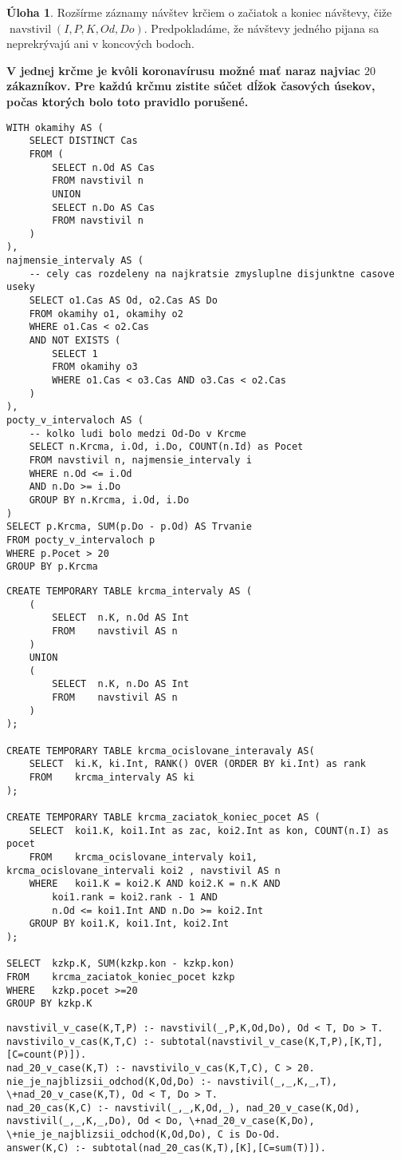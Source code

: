 \documentclass[10pt, a4paper]{article}
\theoremstyle{definition}
\newtheorem{problem}{Úloha}[section]
\DeclareMathOperator{\navstivil}{navstivil}
\begin{document}
\begin{problem}
Rozšírme záznamy návštev krčiem o začiatok a koniec návštevy, čiže $\navstivil(I, P, K, Od, Do)$. Predpokladáme, že návštevy jedného pijana sa neprekrývajú ani v koncových bodoch.

{\bf V jednej krčme je kvôli koronavírusu možné mať naraz najviac $20$ zákazníkov. Pre každú krčmu zistite súčet dĺžok časových úsekov, počas ktorých bolo toto pravidlo porušené.}

\begin{verbatim}
WITH okamihy AS (
    SELECT DISTINCT Cas
    FROM (
        SELECT n.Od AS Cas
        FROM navstivil n
        UNION
        SELECT n.Do AS Cas
        FROM navstivil n
    )
),
najmensie_intervaly AS (
    -- cely cas rozdeleny na najkratsie zmysluplne disjunktne casove useky
    SELECT o1.Cas AS Od, o2.Cas AS Do
    FROM okamihy o1, okamihy o2
    WHERE o1.Cas < o2.Cas
    AND NOT EXISTS (
        SELECT 1
        FROM okamihy o3
        WHERE o1.Cas < o3.Cas AND o3.Cas < o2.Cas
    )
),
pocty_v_intervaloch AS (
    -- kolko ludi bolo medzi Od-Do v Krcme
    SELECT n.Krcma, i.Od, i.Do, COUNT(n.Id) as Pocet
    FROM navstivil n, najmensie_intervaly i
    WHERE n.Od <= i.Od
    AND n.Do >= i.Do
    GROUP BY n.Krcma, i.Od, i.Do
)
SELECT p.Krcma, SUM(p.Do - p.Od) AS Trvanie
FROM pocty_v_intervaloch p
WHERE p.Pocet > 20
GROUP BY p.Krcma
\end{verbatim}

\begin{verbatim}
CREATE TEMPORARY TABLE krcma_intervaly AS (
	(
		SELECT	n.K, n.Od AS Int
		FROM	navstivil AS n
	)
	UNION
	(
		SELECT	n.K, n.Do AS Int
		FROM	navstivil AS n
	)
);

CREATE TEMPORARY TABLE krcma_ocislovane_interavaly AS(
	SELECT	ki.K, ki.Int, RANK() OVER (ORDER BY ki.Int) as rank
	FROM	krcma_intervaly AS ki
);

CREATE TEMPORARY TABLE krcma_zaciatok_koniec_pocet AS (
	SELECT	koi1.K, koi1.Int as zac, koi2.Int as kon, COUNT(n.I) as pocet
	FROM	krcma_ocislovane_intervaly koi1, krcma_ocislovane_intervali koi2 , navstivil AS n
	WHERE	koi1.K = koi2.K AND koi2.K = n.K AND 
		koi1.rank = koi2.rank - 1 AND 
		n.Od <= koi1.Int AND n.Do >= koi2.Int
	GROUP BY koi1.K, koi1.Int, koi2.Int
);

SELECT	kzkp.K, SUM(kzkp.kon - kzkp.kon)
FROM	krcma_zaciatok_koniec_pocet kzkp
WHERE	kzkp.pocet >=20
GROUP BY kzkp.K
\end{verbatim}

\begin{verbatim}
navstivil_v_case(K,T,P) :- navstivil(_,P,K,Od,Do), Od < T, Do > T.
navstivilo_v_cas(K,T,C) :- subtotal(navstivil_v_case(K,T,P),[K,T],[C=count(P)]).
nad_20_v_case(K,T) :- navstivilo_v_cas(K,T,C), C > 20.
nie_je_najblizsii_odchod(K,Od,Do) :- navstivil(_,_,K,_,T), \+nad_20_v_case(K,T), Od < T, Do > T.
nad_20_cas(K,C) :- navstivil(_,_,K,Od,_), nad_20_v_case(K,Od), navstivil(_,_,K,_,Do), Od < Do, \+nad_20_v_case(K,Do), \+nie_je_najblizsii_odchod(K,Od,Do), C is Do-Od.
answer(K,C) :- subtotal(nad_20_cas(K,T),[K],[C=sum(T)]).
\end{verbatim}

\end{problem}
\end{document}
